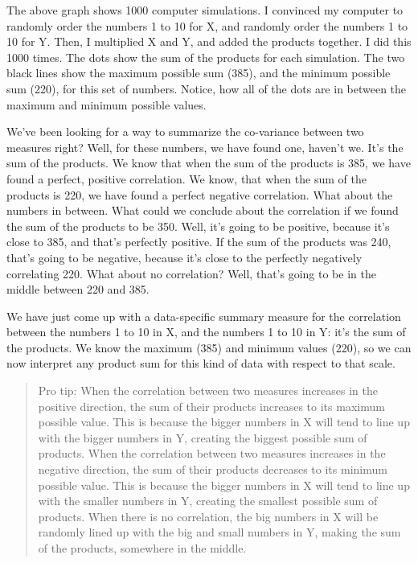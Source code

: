 \documentclass[
]{book}
\begin{document}
The above graph shows 1000 computer simulations. I convinced my computer to randomly order the numbers 1 to 10 for X, and randomly order the numbers 1 to 10 for Y. Then, I multiplied X and Y, and added the products together. I did this 1000 times. The dots show the sum of the products for each simulation. The two black lines show the maximum possible sum (385), and the minimum possible sum (220), for this set of numbers. Notice, how all of the dots are in between the maximum and minimum possible values.

We've been looking for a way to summarize the co-variance between two measures right? Well, for these numbers, we have found one, haven't we. It's the sum of the products. We know that when the sum of the products is 385, we have found a perfect, positive correlation. We know, that when the sum of the products is 220, we have found a perfect negative correlation. What about the numbers in between. What could we conclude about the correlation if we found the sum of the products to be 350. Well, it's going to be positive, because it's close to 385, and that's perfectly positive. If the sum of the products was 240, that's going to be negative, because it's close to the perfectly negatively correlating 220. What about no correlation? Well, that's going to be in the middle between 220 and 385.

We have just come up with a data-specific summary measure for the correlation between the numbers 1 to 10 in X, and the numbers 1 to 10 in Y: it's the sum of the products. We know the maximum (385) and minimum values (220), so we can now interpret any product sum for this kind of data with respect to that scale.

\begin{quote}
Pro tip: When the correlation between two measures increases in the positive direction, the sum of their products increases to its maximum possible value. This is because the bigger numbers in X will tend to line up with the bigger numbers in Y, creating the biggest possible sum of products. When the correlation between two measures increases in the negative direction, the sum of their products decreases to its minimum possible value. This is because the bigger numbers in X will tend to line up with the smaller numbers in Y, creating the smallest possible sum of products. When there is no correlation, the big numbers in X will be randomly lined up with the big and small numbers in Y, making the sum of the products, somewhere in the middle.
\end{quote}
\end{document}
